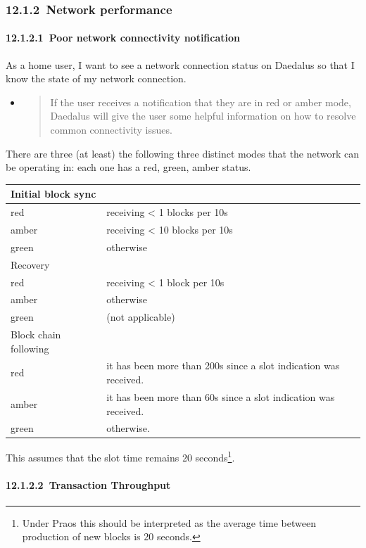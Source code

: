 \documentclass[]{article}
\let\oldparagraph\paragraph
\renewcommand{\paragraph}[1]{\oldparagraph{#1}\mbox{}}
\begin{document}
\hypertarget{network-performance}{%
\subsubsection{​12.1.2​~Network performance}\label{network-performance}}

\hypertarget{poor-network-connectivity-notification}{%
\paragraph{​12.1.2.1​~Poor network connectivity notification
}\label{poor-network-connectivity-notification}}

As a home user, I want to see a network connection status on Daedalus so
that I know the state of my network connection.

\begin{itemize}
\item
  \begin{quote}
  If the user receives a notification that they are in red or amber
  mode, Daedalus will give the user some helpful information on how to
  resolve common connectivity issues.
  \end{quote}
\end{itemize}

There are three (at least) the following three distinct modes that the
network can be operating in: each one has a red, green, amber status.

\begin{longtable}[]{@{}ll@{}}
\toprule
Initial block sync &\tabularnewline
\midrule
\endhead
red & receiving \textless{} 1 blocks per 10s\tabularnewline
amber & receiving \textless{} 10 blocks per 10s\tabularnewline
green & otherwise\tabularnewline
Recovery &\tabularnewline
red & receiving \textless{} 1 block per 10s\tabularnewline
amber & otherwise\tabularnewline
green & (not applicable)\tabularnewline
Block chain following &\tabularnewline
red & it has been more than 200s since a slot indication was
received.\tabularnewline
amber & it has been more than 60s since a slot indication was
received.\tabularnewline
green & otherwise.\tabularnewline
\bottomrule
\end{longtable}

This assumes that the slot time remains 20 seconds\footnote{Under Praos
  this should be interpreted as the average time between production of
  new blocks is 20 seconds.}.

\hypertarget{transaction-throughput}{%
\paragraph{​12.1.2.2​~Transaction
Throughput}\label{transaction-throughput}}
\end{document}
